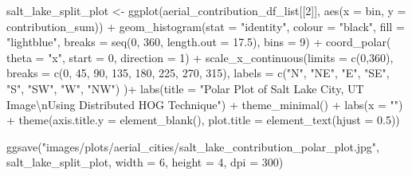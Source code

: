 \documentclass[
  letterpaper,
  DIV=11,
  numbers=noendperiod]{scrreprt}
\newenvironment{Shaded}{\begin{snugshade}}{\end{snugshade}}
\newcommand{\AttributeTok}[1]{\textcolor[rgb]{0.40,0.45,0.13}{#1}}
\newcommand{\DecValTok}[1]{\textcolor[rgb]{0.68,0.00,0.00}{#1}}
\newcommand{\FloatTok}[1]{\textcolor[rgb]{0.68,0.00,0.00}{#1}}
\newcommand{\FunctionTok}[1]{\textcolor[rgb]{0.28,0.35,0.67}{#1}}
\newcommand{\NormalTok}[1]{\textcolor[rgb]{0.00,0.23,0.31}{#1}}
\newcommand{\OtherTok}[1]{\textcolor[rgb]{0.00,0.23,0.31}{#1}}
\newcommand{\SpecialCharTok}[1]{\textcolor[rgb]{0.37,0.37,0.37}{#1}}
\newcommand{\StringTok}[1]{\textcolor[rgb]{0.13,0.47,0.30}{#1}}
\begin{document}
\begin{Shaded}
\begin{Highlighting}[]
\NormalTok{salt\_lake\_split\_plot }\OtherTok{\textless{}{-}}
  \FunctionTok{ggplot}\NormalTok{(aerial\_contribution\_df\_list[[}\DecValTok{2}\NormalTok{]], }
         \FunctionTok{aes}\NormalTok{(}\AttributeTok{x =}\NormalTok{ bin, }\AttributeTok{y =}\NormalTok{ contribution\_sum)) }\SpecialCharTok{+}
  \FunctionTok{geom\_histogram}\NormalTok{(}\AttributeTok{stat =} \StringTok{"identity"}\NormalTok{,}
                 \AttributeTok{colour =} \StringTok{"black"}\NormalTok{, }
                 \AttributeTok{fill =} \StringTok{"lightblue"}\NormalTok{, }
                 \AttributeTok{breaks =} \FunctionTok{seq}\NormalTok{(}\DecValTok{0}\NormalTok{, }\DecValTok{360}\NormalTok{, }\AttributeTok{length.out =} \FloatTok{17.5}\NormalTok{),}
                 \AttributeTok{bins =} \DecValTok{9}\NormalTok{) }\SpecialCharTok{+}
  \FunctionTok{coord\_polar}\NormalTok{(}
    \AttributeTok{theta =} \StringTok{"x"}\NormalTok{, }
    \AttributeTok{start =} \DecValTok{0}\NormalTok{, }
    \AttributeTok{direction =} \DecValTok{1}\NormalTok{) }\SpecialCharTok{+}
  \FunctionTok{scale\_x\_continuous}\NormalTok{(}\AttributeTok{limits =} \FunctionTok{c}\NormalTok{(}\DecValTok{0}\NormalTok{,}\DecValTok{360}\NormalTok{),}
    \AttributeTok{breaks =} \FunctionTok{c}\NormalTok{(}\DecValTok{0}\NormalTok{, }\DecValTok{45}\NormalTok{, }\DecValTok{90}\NormalTok{, }\DecValTok{135}\NormalTok{, }\DecValTok{180}\NormalTok{, }\DecValTok{225}\NormalTok{, }\DecValTok{270}\NormalTok{, }\DecValTok{315}\NormalTok{), }
    \AttributeTok{labels =} \FunctionTok{c}\NormalTok{(}\StringTok{"N"}\NormalTok{, }\StringTok{"NE"}\NormalTok{, }\StringTok{"E"}\NormalTok{, }\StringTok{"SE"}\NormalTok{, }\StringTok{"S"}\NormalTok{, }\StringTok{"SW"}\NormalTok{, }\StringTok{"W"}\NormalTok{, }\StringTok{"NW"}\NormalTok{)}
\NormalTok{  )}\SpecialCharTok{+}
  \FunctionTok{labs}\NormalTok{(}\AttributeTok{title =} \StringTok{"Polar Plot of Salt Lake City, UT Image}\SpecialCharTok{\textbackslash{}n}\StringTok{Using Distributed HOG Technique"}\NormalTok{) }\SpecialCharTok{+}
  \FunctionTok{theme\_minimal}\NormalTok{() }\SpecialCharTok{+}
  \FunctionTok{labs}\NormalTok{(}\AttributeTok{x =} \StringTok{""}\NormalTok{) }\SpecialCharTok{+}
  \FunctionTok{theme}\NormalTok{(}\AttributeTok{axis.title.y =} \FunctionTok{element\_blank}\NormalTok{(),}
        \AttributeTok{plot.title =} \FunctionTok{element\_text}\NormalTok{(}\AttributeTok{hjust =} \FloatTok{0.5}\NormalTok{))}

\FunctionTok{ggsave}\NormalTok{(}\StringTok{"images/plots/aerial\_cities/salt\_lake\_contribution\_polar\_plot.jpg"}\NormalTok{, salt\_lake\_split\_plot, }\AttributeTok{width =} \DecValTok{6}\NormalTok{, }\AttributeTok{height =} \DecValTok{4}\NormalTok{, }\AttributeTok{dpi =} \DecValTok{300}\NormalTok{)}
\end{Highlighting}
\end{Shaded}
\end{document}
